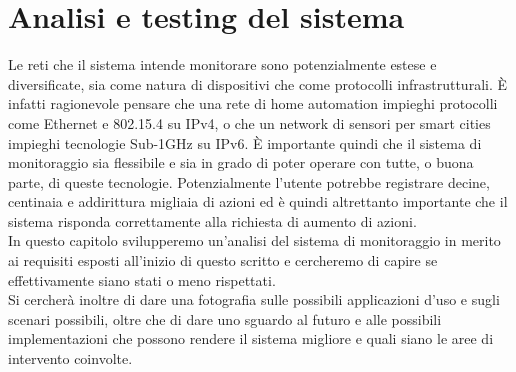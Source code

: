 \chapter{Analisi e testing del sistema}
Le reti che il sistema intende monitorare sono potenzialmente estese e diversificate, sia come natura di dispositivi che come protocolli infrastrutturali. È infatti ragionevole pensare che una rete di home automation impieghi protocolli come Ethernet e 802.15.4 su IPv4, o che un network di sensori per smart cities impieghi tecnologie Sub-1GHz su IPv6. È importante quindi che il sistema di monitoraggio sia flessibile e sia in grado di poter operare con tutte, o buona parte, di queste tecnologie. Potenzialmente l'utente potrebbe registrare decine, centinaia e addirittura migliaia di azioni ed è quindi altrettanto importante che il sistema risponda correttamente alla richiesta di aumento di azioni.
\\In questo capitolo svilupperemo un'analisi del sistema di monitoraggio in merito ai requisiti esposti all'inizio di questo scritto e cercheremo di capire se effettivamente siano stati o meno rispettati.
\\Si cercherà inoltre di dare una fotografia sulle possibili applicazioni d'uso e sugli scenari possibili, oltre che di dare uno sguardo al futuro e alle possibili implementazioni che possono rendere il sistema migliore e quali siano le aree di intervento coinvolte.

